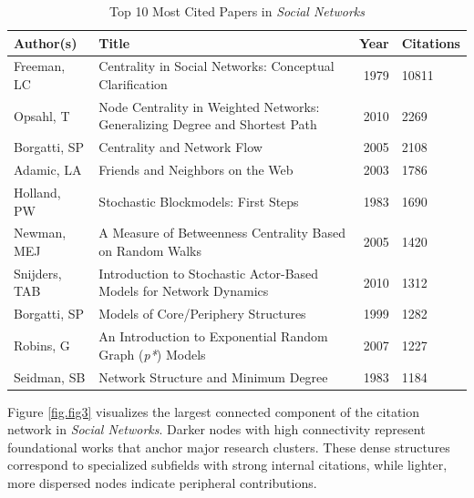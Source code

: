 \documentclass[twocolumn]{article}
\begin{document}
	\begin{table}[htbp]
		\centering
		\scriptsize
		\caption{Top 10 Most Cited Papers in \textit{Social Networks}}
		\label{table.tab4}
		\begin{tabularx}{\textwidth}{llrl}
			\toprule
			\textbf{Author(s)} & \textbf{Title} & \textbf{Year} & \textbf{Citations} \\
			\midrule
			Freeman, LC & Centrality in Social Networks: Conceptual Clarification & 1979 & 10811 \\
			Opsahl, T & Node Centrality in Weighted Networks: Generalizing Degree and Shortest Path & 2010 & 2269 \\
			Borgatti, SP & Centrality and Network Flow & 2005 & 2108 \\
			Adamic, LA & Friends and Neighbors on the Web & 2003 & 1786 \\
			Holland, PW & Stochastic Blockmodels: First Steps & 1983 & 1690 \\
			Newman, MEJ & A Measure of Betweenness Centrality Based on Random Walks & 2005 & 1420 \\
			Snijders, TAB & Introduction to Stochastic Actor-Based Models for Network Dynamics & 2010 & 1312 \\
			Borgatti, SP & Models of Core/Periphery Structures & 1999 & 1282 \\
			Robins, G & An Introduction to Exponential Random Graph (\textit{p*}) Models & 2007 & 1227 \\
			Seidman, SB & Network Structure and Minimum Degree & 1983 & 1184 \\
			\bottomrule
		\end{tabularx}
	\end{table}
	
	Figure \ref{fig.fig3} visualizes the largest connected component of the citation network in \textit{Social Networks}. Darker nodes with high connectivity represent foundational works that anchor major research clusters. These dense structures correspond to specialized subfields with strong internal citations, while lighter, more dispersed nodes indicate peripheral contributions.
	
\end{document}
